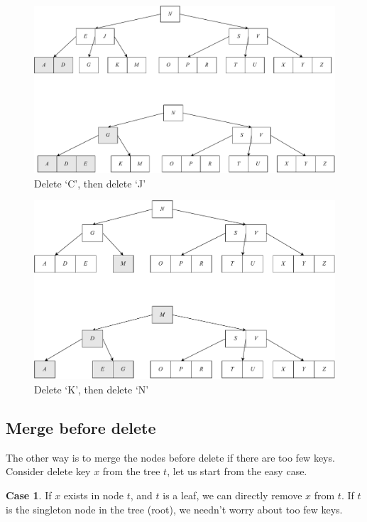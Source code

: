 \documentclass[b5paper]{article}
\begin{document}
\begin{figure}[htbp]
  \centering
  \includegraphics[scale=0.33]{img/btree-del-CJ}
  \caption{Delete `C', then delete `J'}
  \label{fig:btree-del-CJ}
\end{figure}

\begin{figure}[htbp]
  \centering
  \includegraphics[scale=0.33]{img/btree-del-KN}
  \caption{Delete `K', then delete `N'}
  \label{fig:btree-del-KN}
\end{figure}

\subsection{Merge before delete}

The other way is to merge the nodes before delete if there are too few keys. Consider delete key $x$ from the tree $t$, let us start from the easy case.

\textbf{Case 1}. If $x$ exists in node $t$, and $t$ is a leaf, we can directly remove $x$ from $t$. If $t$ is the singleton node in the tree (root), we needn't worry about too few keys.
\end{document}
